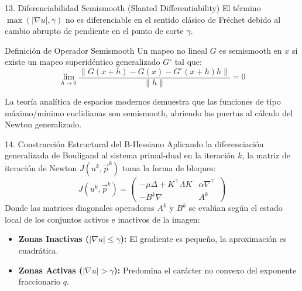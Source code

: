 \documentclass[aspectratio=169,11pt]{beamer}
\begin{document}
\begin{frame}{13. Diferenciabilidad Semismooth (Slanted Differentiability)}
    El término $\max(|\nabla u|, \gamma)$ no es diferenciable en el sentido clásico de Fréchet debido al cambio abrupto de pendiente en el punto de corte $\gamma$.
    
    \begin{block}{Definición de Operador Semismooth}
        Un mapeo no lineal $G$ es semismooth en $x$ si existe un mapeo superidéntico generalizado $G^\circ$ tal que:
        \begin{equation}
            \lim_{h \to 0} \frac{\parallel G(x+h) - G(x) - G^\circ(x+h)h \parallel}{\parallel h \parallel} = 0
        \end{equation}
    \end{block}
    La teoría analítica de espacios modernos demuestra que las funciones de tipo máximo/mínimo euclidianas son semismooth, abriendo las puertas al cálculo del Newton generalizado.
\end{frame}

\begin{frame}{14. Construcción Estructural del B-Hessiano}
    Aplicando la diferenciación generalizada de Bouligand al sistema primal-dual en la iteración $k$, la matriz de iteración de Newton $J(u^k, \vec{p}^k)$ toma la forma de bloques:
    \begin{equation}
        J(u^k, \vec{p}^k) = \begin{pmatrix}
            -\mu \Delta + K^\top \Lambda K & \alpha \nabla^\top \\
            -B^k \nabla & A^k
        \end{pmatrix}
    \end{equation}
    Donde las matrices diagonales operadoras $A^k$ y $B^k$ se evalúan según el estado local de los conjuntos activos e inactivos de la imagen:
    \begin{itemize}
        \item \textbf{Zonas Inactivas ($|\nabla u| \le \gamma$):} El gradiente es pequeño, la aproximación es cuadrática.
        \item \textbf{Zonas Activas ($|\nabla u| > \gamma$):} Predomina el carácter no convexo del exponente fraccionario $q$.
    \end{itemize}
\end{frame}
\end{document}
